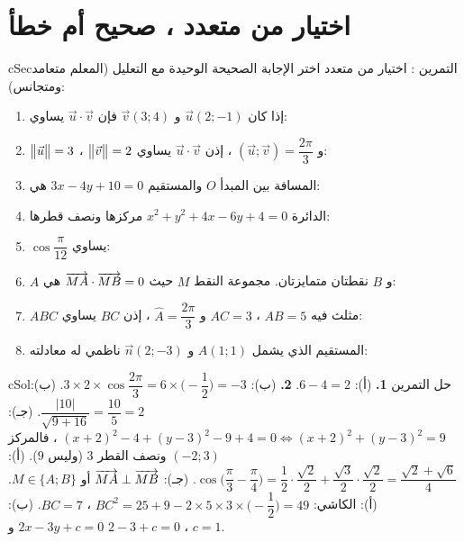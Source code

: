 \documentclass[12pt,a4paper]{article}
\newenvironment{BOX}[2]{\begin{otherlanguage}{english}\begin{arbox}{#1}{#2}}{\end{arbox}\end{otherlanguage}}
\newcounter{exo}
\newenvironment{tamrin}[1]{\stepcounter{exo}\begin{BOX}{cSec}{التمرين \theexo: #1}}{\end{BOX}}
\newenvironment{hal}{\Needspace{12\baselineskip}\begin{otherlanguage}{english}\begin{arbox}[breakable]{cSol}{حل التمرين \theexo}}{\end{arbox}\end{otherlanguage}}
\begin{document}
\section{اختيار من متعدد ، صحيح أم خطأ}
\begin{tamrin}{اختيار من متعدد}
اختر الإجابة الصحيحة الوحيدة مع التعليل (المعلم متعامد ومتجانس):
\begin{enumerate}
\item إذا كان $\vec u(2;-1)$ و $\vec v(3;4)$ فإن $\vec u\cdot\vec v$ يساوي:
\item $\big\|\vec u\big\|=3$ ، $\big\|\vec v\big\|=2$ و $(\vec u;\vec v)=\dfrac{2\pi}{3}$ ، إذن $\vec u\cdot\vec v$ يساوي:
\item المسافة بين المبدأ $O$ والمستقيم $3x-4y+10=0$ هي:
\item الدائرة $x^2+y^2+4x-6y+4=0$ مركزها ونصف قطرها:
\item $\cos\dfrac{\pi}{12}$ يساوي:
\item $A$ و $B$ نقطتان متمايزتان. مجموعة النقط $M$ حيث $\overrightarrow{MA}\cdot\overrightarrow{MB}=0$ هي:
\item $ABC$ مثلث فيه $AB=5$ ، $AC=3$ و $\widehat{A}=\dfrac{2\pi}{3}$ ، إذن $BC$ يساوي:
\item المستقيم الذي يشمل $A(1;1)$ و $\vec n(2;-3)$ ناظمي له معادلته:
\end{enumerate}
\end{tamrin}
\begin{hal}
\textbf{1.} (أ): $6-4=2$. \quad \textbf{2.} (ب): $3\times2\times\cos\dfrac{2\pi}3=6\times\Big(-\dfrac12\Big)=-3$.
 (ب): $\dfrac{|10|}{\sqrt{9+16}}=\dfrac{10}5=2$.
 (جـ): $(x+2)^2-4+(y-3)^2-9+4=0\iff(x+2)^2+(y-3)^2=9$ ، فالمركز $(-2;3)$ ونصف القطر $3$ (وليس $9$).
 (أ): $\cos\Big(\dfrac\pi3-\dfrac\pi4\Big)=\dfrac12\cdot\dfrac{\sqrt2}2+\dfrac{\sqrt3}2\cdot\dfrac{\sqrt2}2=\dfrac{\sqrt2+\sqrt6}4$.
 (جـ): $\overrightarrow{MA}\perp\overrightarrow{MB}$ أو $M\in\{A;B\}$.
 (أ): الكاشي: $BC^2=25+9-2\times5\times3\times\Big(-\dfrac12\Big)=49$ ، $BC=7$.
 (ب): $2x-3y+c=0$ و $2-3+c=0$ ، $c=1$.
\end{hal}
\end{document}
